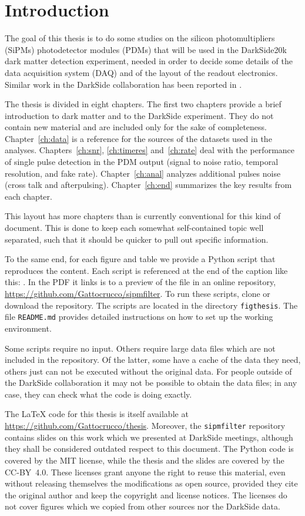 \chapter*{Introduction}

The goal of this thesis is to do some studies on the silicon photomultipliers
(SiPMs) photodetector modules (PDMs) that will be used in the DarkSide20k dark
matter detection experiment, needed in order to decide some details of the data
acquisition system (DAQ) and of the layout of the readout electronics. Similar
work in the DarkSide collaboration has been reported in
\cite[ch.~3,~5]{savarese2018}.

The thesis is divided in eight chapters. The first two chapters provide a brief
introduction to dark matter and to the DarkSide experiment. They do not contain
new material and are included only for the sake of completeness.
Chapter~\ref{ch:data} is a reference for the sources of the datasets used in
the analyses. Chapters~\ref{ch:snr}, \ref{ch:timeres} and~\ref{ch:rate} deal
with the performance of single pulse detection in the PDM output (signal to
noise ratio, temporal resolution, and fake rate). Chapter~\ref{ch:anal}
analyzes additional pulses noise (cross talk and afterpulsing).
Chapter~\ref{ch:end} summarizes the key results from each chapter.

This layout has more chapters than is currently conventional for this kind of
document. This is done to keep each somewhat self-contained topic well
separated, such that it should be quicker to pull out specific information.

To the same end, for each figure and table we provide a Python script that
reproduces the content. Each script is referenced at the end of the caption
like this: . In the PDF it links is to a preview of the
file in an online repository, \url{https://github.com/Gattocrucco/sipmfilter}.
To run these scripts, clone or download the repository. The scripts are located
in the directory \nolinkurl{figthesis}. The file \nolinkurl{README.md} provides
detailed instructions on how to set up the working environment.

Some scripts require no input. Others require large data files which are not
included in the repository. Of the latter, some have a cache of the data they
need, others just can not be executed without the original data. For people
outside of the DarkSide collaboration it may not be possible to obtain the data
files; in any case, they can check what the code is doing exactly.

The \LaTeX{} code for this thesis is itself available at
\url{https://github.com/Gattocrucco/thesis}. Moreover, the
\nolinkurl{sipmfilter} repository contains slides on this work which we
presented at DarkSide meetings, although they shall be considered outdated
respect to this document. The Python code is covered by the MIT license, while
the thesis and the slides are covered by the CC-BY~4.0. These licenses grant
anyone the right to reuse this material, even without releasing themselves the
modifications as open source, provided they cite the original author and keep
the copyright and license notices. The licenses do not cover figures which we
copied from other sources nor the DarkSide data.
